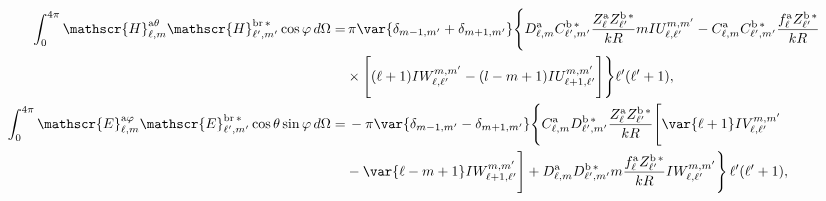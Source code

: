 \vspace{-0.8cm}
\begin{align}
%
\int_{0}^{4\pi} \mathscr{H}_{\ell, m}^{\text{a}\theta}\mathscr{H}_{\ell^{\prime}, m^{\prime}}^{\text{br}\,*} \cos\varphi \, d\Omega =& 
%
\, \pi \var{ \delta_{m-1, m^{\prime}} + \delta_{m+1, m^{\prime}} } \Bigg\{D_{\ell,m}^{\rm a}C_{\ell^{\prime}, m^{\prime}}^{\rm b \, *}\frac{Z_{\ell}^{\rm a}Z_{\ell^{\prime}}^{\rm b\, *}}{k R} m IU_{\ell, \ell^{\prime}}^{m, m^{\prime}} 
%
-C_{\ell, m}^{\rm a}C_{\ell^{\prime}, m^{\prime}}^{\rm b \, *} \frac{f_{\ell}^{\rm a}Z_{\ell^{\prime}}^{\rm b \, *}}{k R} \nonumber \\
%
& \times \Bigg[ (\ell+1) IW_{\ell, \ell^{\prime}}^{m, m^{\prime}} 
%
-(l-m+1) IU_{\ell + 1, \ell^{\prime}}^{m, m^{\prime}} \Bigg] \Bigg\}\ell^{\prime}(\ell^{\prime}+1),\\
%
%
%
%
\int_0^{4\pi}\mathscr{E}_{\ell, m}^{\text{a}\varphi}\mathscr{E}_{\ell^{\prime}, m^{\prime}}^{\text{br}\,*}\cos\theta\sin\varphi \, d\Omega
%
 =& \, - \pi \var{ \delta_{m-1, m^{\prime}} - \delta_{m+1, m^{\prime}} } \Bigg\{ C_{\ell, m}^{\rm a} D_{\ell^{\prime}, m^{\prime}}^{\rm b \, *} \frac{Z_{\ell}^{\rm a} Z_{\ell^{\prime}}^{\rm b \, *}}{k R} \Bigg[\var{\ell +1} IV_{\ell, \ell^{\prime}}^{m, m^{\prime}} \nonumber \\
%
&-\var{\ell - m +1} IW_{\ell + 1, \ell^{\prime}}^{m, m^{\prime}} \Bigg]
%
 + D_{\ell, m}^{\rm a} D_{\ell^{\prime}, m^{\prime}}^{\rm b \, *} m \frac{f_{\ell}^{\rm a} Z_{\ell^{\prime}}^{\rm b\, *}}{k R} IW_{\ell, \ell^{\prime}}^{m, m^{\prime}} \Bigg\} \, \ell^{\prime}(\ell^{\prime}+1),  
%
%
\end{align}
\vspace{-0.8cm}

